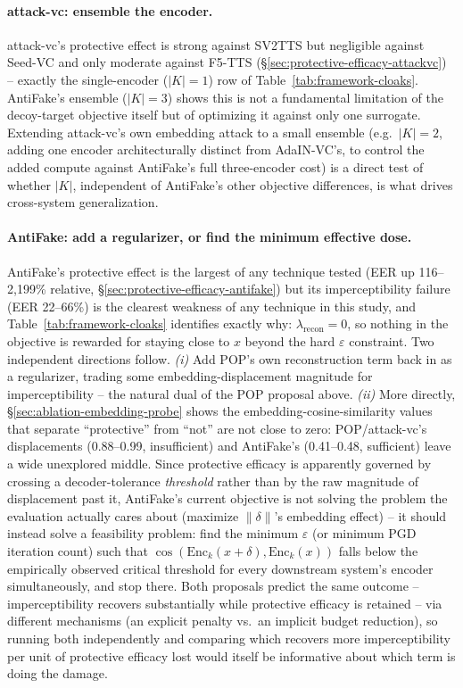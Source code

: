 \documentclass[11pt]{article}
\begin{document}
\paragraph{attack-vc: ensemble the encoder.} attack-vc's protective
effect is strong against SV2TTS but negligible against Seed-VC and only
moderate against F5-TTS (\S\ref{sec:protective-efficacy-attackvc}) --
exactly the single-encoder ($|K|=1$) row of
Table~\ref{tab:framework-cloaks}. AntiFake's ensemble
($|K|=3$) shows this is not a fundamental limitation of the decoy-target
objective itself but of optimizing it against only one surrogate.
Extending attack-vc's own embedding attack to a small ensemble (e.g.\
$|K|=2$, adding one encoder architecturally distinct from AdaIN-VC's,
to control the added compute against AntiFake's full three-encoder
cost) is a direct test of whether $|K|$, independent of AntiFake's
other objective differences, is what drives cross-system
generalization.

\paragraph{AntiFake: add a regularizer, or find the minimum effective
dose.} AntiFake's protective effect is the largest of any technique
tested (EER up 116--2,199\% relative,
\S\ref{sec:protective-efficacy-antifake}) but its imperceptibility
failure (EER 22--66\%) is the clearest weakness of any technique in
this study, and Table~\ref{tab:framework-cloaks} identifies exactly why:
$\lambda_{\mathrm{recon}}=0$, so nothing in the objective is rewarded
for staying close to $x$ beyond the hard $\varepsilon$ constraint. Two
independent directions follow. \emph{(i)} Add POP's own reconstruction
term back in as a regularizer, trading some embedding-displacement
magnitude for imperceptibility -- the natural dual of the POP proposal
above. \emph{(ii)} More directly, \S\ref{sec:ablation-embedding-probe}
shows the embedding-cosine-similarity values that separate ``protective''
from ``not'' are not close to zero: POP/attack-vc's displacements
(0.88--0.99, insufficient) and AntiFake's (0.41--0.48, sufficient)
leave a wide unexplored middle. Since protective efficacy is
apparently governed by crossing a decoder-tolerance \emph{threshold}
rather than by the raw magnitude of displacement past it, AntiFake's
current objective is not solving the problem the evaluation actually
cares about (maximize $\|\delta\|$'s embedding effect) -- it should
instead solve a feasibility problem: find the minimum $\varepsilon$ (or
minimum PGD iteration count) such that
$\cos(\mathrm{Enc}_k(x+\delta), \mathrm{Enc}_k(x))$ falls below the
empirically observed critical threshold for every downstream system's
encoder simultaneously, and stop there. Both proposals predict the same
outcome -- imperceptibility recovers substantially while protective
efficacy is retained -- via different mechanisms (an explicit penalty
vs.\ an implicit budget reduction), so running both independently and
comparing which recovers more imperceptibility per unit of protective
efficacy lost would itself be informative about which term is doing
the damage.
\end{document}
